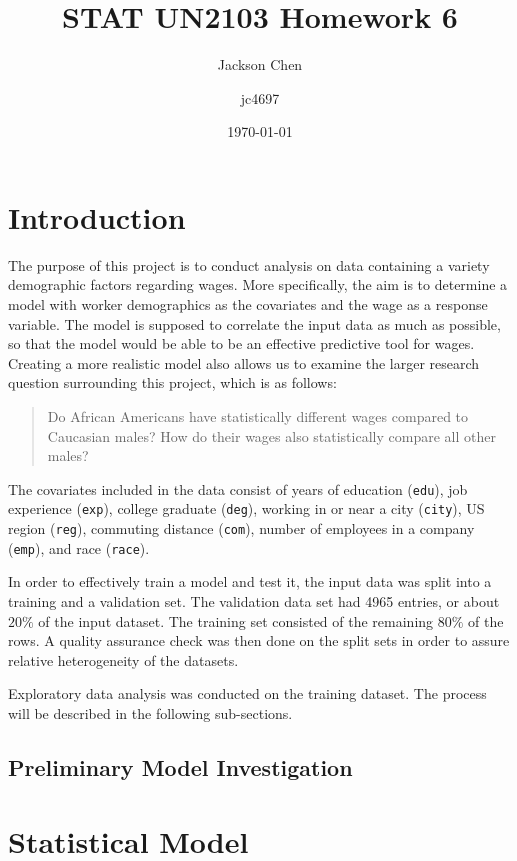 \documentclass{article}
\title{STAT UN2103 Homework 6}
\author{
  Jackson Chen
  \and
  jc4697
}
\date{\today}
\begin{document}
  \maketitle

  \section{Introduction}

    The purpose of this project is to conduct analysis on data containing a variety
    demographic factors regarding wages. More specifically, the aim is to determine
    a model with worker demographics as the covariates and the wage as a response variable.
    The model is supposed to correlate the input data as much as possible, so that the
    model would be able to be an effective predictive tool for wages. Creating a more
    realistic model also allows us to examine the larger research question surrounding
    this project, which is as follows:
    \begin{quote}
      Do African Americans have statistically different wages compared to Caucasian males?
      How do their wages also statistically compare all other males?
    \end{quote}

    The covariates included in the data consist of years of education (\texttt{edu}),
    job experience (\texttt{exp}), college graduate (\texttt{deg}), working in or near a city
    (\texttt{city}), US region (\texttt{reg}), commuting distance (\texttt{com}), number
    of employees in a company (\texttt{emp}), and race (\texttt{race}).

    In order to effectively train a model and test it, the input data was split into
    a training and a validation set. The validation data set had 4965 entries, or about
    $20\%$ of the input dataset. The training set consisted of the remaining $80\%$ of
    the rows. A quality assurance check was then done on the split sets in order to assure
    relative heterogeneity of the datasets.

    Exploratory data analysis was conducted on the training dataset. The process will be
    described in the following sub-sections.

    \subsection{Preliminary Model Investigation}


  \section{Statistical Model} \label{final_model}
\end{document}
